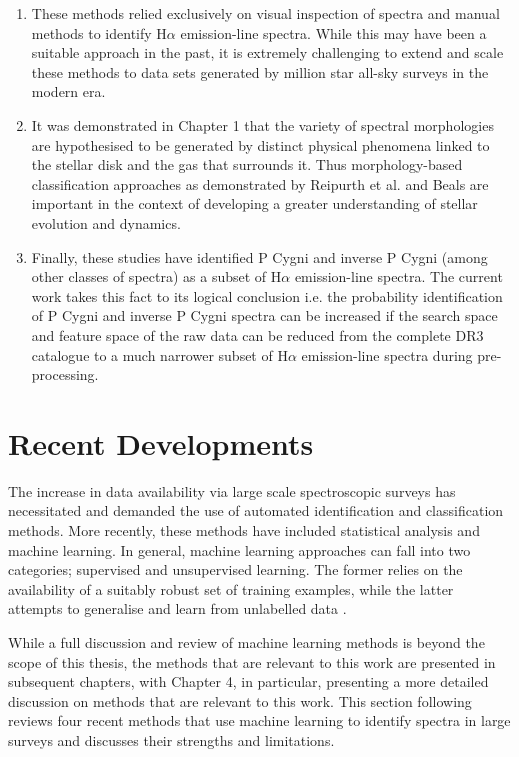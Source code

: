 \begin{enumerate}
\item These methods relied exclusively on visual inspection of spectra and manual methods to identify H$\alpha$ emission-line spectra. While this may have been a suitable approach in the past, it is extremely challenging to extend and scale these methods to data sets generated by million star all-sky surveys in the modern era.
\item It was demonstrated in Chapter 1 that the variety of spectral morphologies are hypothesised to be generated by distinct physical phenomena linked to the stellar disk and the gas that surrounds it. Thus morphology-based classification approaches as demonstrated by Reipurth et al. and Beals are important in the context of developing a greater understanding of stellar evolution and dynamics.
\item Finally, these studies have identified P Cygni and inverse P Cygni (among other classes of spectra) as a subset of H$\alpha$ emission-line spectra. The current work takes this fact to its logical conclusion i.e. the probability identification of P Cygni and inverse P Cygni spectra can be increased if the search space and feature space of the raw data can be reduced from the complete DR3 catalogue to a much narrower subset of H$\alpha$ emission-line spectra during pre-processing. 
\end{enumerate}

\section{Recent Developments}
The increase in data availability via large scale spectroscopic surveys has necessitated and demanded the use of automated identification and classification methods. More recently, these methods have included statistical analysis and machine learning. In general, machine learning approaches can fall into two categories; supervised and unsupervised learning. The former relies on the availability of a suitably robust set of training examples, while the latter attempts to generalise and learn from unlabelled data \citep{hastie2009elements}. 

While a full discussion and review of machine learning methods is beyond the scope of this thesis, the methods that are relevant to this work are presented in subsequent chapters, with Chapter 4, in particular, presenting a more detailed discussion on methods that are relevant to this work. This section following reviews four recent methods that use machine learning to identify spectra in large surveys and discusses their strengths and limitations.

